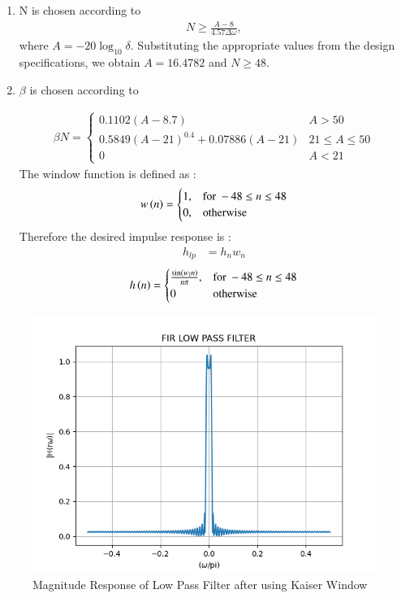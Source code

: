 \documentclass{article}
\begin{document}
\begin{enumerate}
\item  N is chosen according to
\begin{align}
    N \geq \frac{A-8}{4.57\Delta \omega},
\end{align}
where $A = -20\log_{10}\delta$.  Substituting the appropriate values from the design specifications, we obtain
$A = 16.4782$ and $N \geq 48$.


\item  $\beta$ is chosen according to

\begin{align}
    \beta N = \left\{ \begin{array}{ll} 0.1102(A-8.7) & A > 50 \\
0.5849(A-21)^{0.4}+ 0.07886(A-21) & 21 \leq A \leq 50 \\
0 & A < 21\end{array} \right.
\end{align}
The window function is defined as :
\begin{align}
    w\left(n\right) = 
\begin{cases} 
    1, & \text{for } -48\leq n \leq 48 \\
    0, & \text{otherwise } 
\end{cases} \label{eq:w(n)_for_Kaiser}
\end{align}
Therefore the desired impulse response is :
\begin{align}
    h_{lp} &= h_{n}w_{n}
\end{align}
\begin{align}
    h\left(n\right) = 
\begin{cases} 
    \frac{\sin(w_l n)}{n\pi},  & \text{for } -48\leq n \leq 48 \\
    0 &\text{otherwise}
\end{cases} \label{eq:h(n)-desired_for_LPF}
\end{align}
\end{enumerate}
\begin{figure}[H]
\centering
\includegraphics[width=1\columnwidth]{figs/lpf_kw.png}
\caption{Magnitude Response of Low Pass Filter after using Kaiser Window}
\label{fig:Kaiser_LPF_response}
\end{figure}
\end{document}

